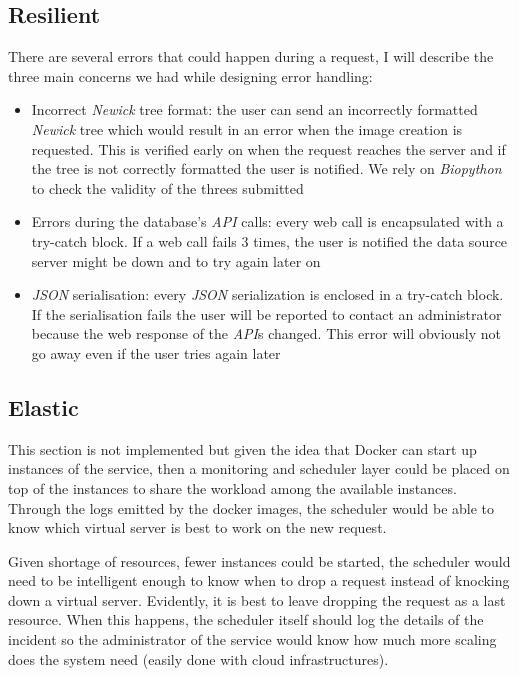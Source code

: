 \documentclass[10pt]{article}
\begin{document}
 \subsection{Resilient}
 	There are several errors that could happen during a request, I will describe the three main concerns we had while designing error handling:
 	
 	\begin{itemize}
  		\item Incorrect \textit{Newick} tree format: the user can send an incorrectly formatted \textit{Newick} tree which would result in an error when the image creation is requested. This is verified early on when the request reaches the server and if the tree is not correctly formatted the user is notified. We rely on \textit{Biopython} to check the validity of the threes submitted
  		\item Errors during the database's \textit{API} calls: every web call is encapsulated with a try-catch block. If a web call fails 3 times, the user is notified the data source server might be down and to try again later on
  		\item \textit{JSON} serialisation: every \textit{JSON} serialization is enclosed in a try-catch block. If the serialisation fails the user will be reported to contact an administrator because the web response of the \textit{API}s changed. This error will obviously not go away even if the user tries again later
	\end{itemize}
 	
 \subsection{Elastic} %
 
This section is not implemented but given the idea that Docker can start up instances of the service, then a monitoring and scheduler layer could be placed on top of the instances to share the workload among the available instances. Through the logs emitted by the docker images, the scheduler would be able to know which virtual server is best to work on the new  request.

Given shortage of resources, fewer instances could be started, the scheduler would need to be intelligent enough to know when to drop a request instead of knocking down a virtual server. Evidently, it is best to leave dropping the request as a last resource. When this happens, the scheduler itself should log the details of the incident so the administrator of the service would know how much more scaling does the system need (easily done with cloud infrastructures).
 
\end{document}

